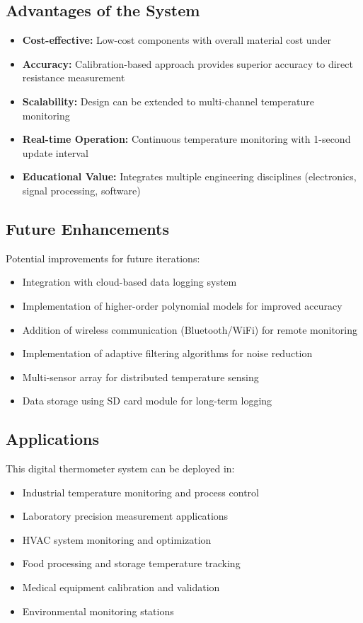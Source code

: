 \documentclass[journal]{IEEEtran}
\begin{document}
\subsection{\textbf{Advantages of the System}}

\begin{itemize}
\item \textbf{Cost-effective:} Low-cost components with overall material cost under 
\item \textbf{Accuracy:} Calibration-based approach provides superior accuracy to direct resistance measurement
\item \textbf{Scalability:} Design can be extended to multi-channel temperature monitoring
\item \textbf{Real-time Operation:} Continuous temperature monitoring with 1-second update interval
\item \textbf{Educational Value:} Integrates multiple engineering disciplines (electronics, signal processing, software)
\end{itemize}

\subsection{\textbf{Future Enhancements}}

Potential improvements for future iterations:

\begin{itemize}
\item Integration with cloud-based data logging system
\item Implementation of higher-order polynomial models for improved accuracy
\item Addition of wireless communication (Bluetooth/WiFi) for remote monitoring
\item Implementation of adaptive filtering algorithms for noise reduction
\item Multi-sensor array for distributed temperature sensing
\item Data storage using SD card module for long-term logging
\end{itemize}

\subsection{\textbf{Applications}}

This digital thermometer system can be deployed in:

\begin{itemize}
\item Industrial temperature monitoring and process control
\item Laboratory precision measurement applications
\item HVAC system monitoring and optimization
\item Food processing and storage temperature tracking
\item Medical equipment calibration and validation
\item Environmental monitoring stations
\end{itemize}
\end{document}
